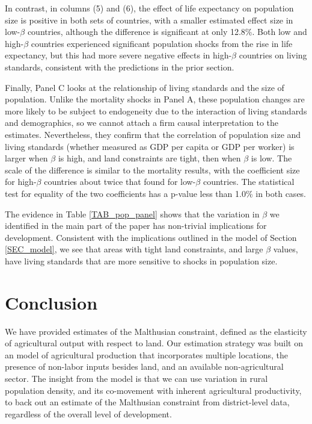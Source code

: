 \documentclass[11pt]{article}
\begin{document}
In contrast, in columns (5) and (6), the effect of life expectancy on population size is positive in both sets of countries, with a smaller estimated effect size in low-$\beta$ countries, although the difference is significant at only 12.8\%. Both low and high-$\beta$ countries experienced significant population shocks from the rise in life expectancy, but this had more severe negative effects in high-$\beta$ countries on living standards, consistent with the predictions in the prior section.

Finally, Panel C looks at the relationship of living standards and the size of population. Unlike the mortality shocks in Panel A, these population changes are more likely to be subject to endogeneity due to the interaction of living standards and demographics, so we cannot attach a firm causal interpretation to the estimates. Nevertheless, they confirm that the correlation of population size and living standards (whether measured as GDP per capita or GDP per worker) is larger when $\beta$ is high, and land constraints are tight, then when $\beta$ is low. The scale of the difference is similar to the mortality results, with the coefficient size for high-$\beta$ countries about twice that found for low-$\beta$ countries. The statistical test for equality of the two coefficients has a p-value less than 1.0\% in both cases.

The evidence in Table \ref{TAB_pop_panel} shows that the variation in $\beta$ we identified in the main part of the paper has non-trivial implications for development. Consistent with the implications outlined in the model of Section \ref{SEC_model}, we see that areas with tight land constraints, and large $\beta$ values, have living standards that are more sensitive to shocks in population size. 

\section{Conclusion}
We have provided estimates of the Malthusian constraint, defined as the elasticity of agricultural output with respect to land. Our estimation strategy was built on an model of agricultural production that incorporates multiple locations, the presence of non-labor inputs besides land, and an available non-agricultural sector. The insight from the model is that we can use variation in rural population density, and its co-movement with inherent agricultural productivity, to back out an estimate of the Malthusian constraint from district-level data, regardless of the overall level of development.
\end{document}
